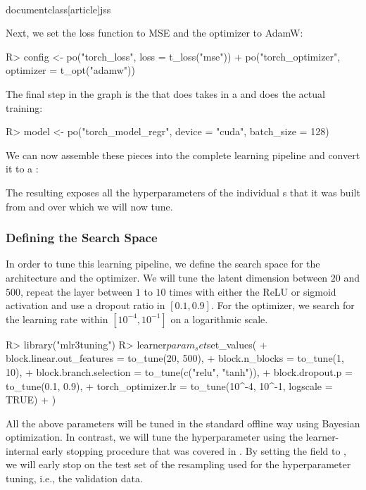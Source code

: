 \\documentclass[article]{jss}
\theoremstyle{definition}
\begin{document}
Next, we set the loss function to MSE and the optimizer to AdamW:

\begin{CodeInput}
R> config <- po("torch_loss", loss = t_loss("mse")) %
+    po("torch_optimizer", optimizer = t_opt("adamw"))
\end{CodeInput}

The final step in the graph is the  that does takes in a  and does the actual training:

\begin{CodeInput}
R> model <- po("torch_model_regr", device = "cuda", batch_size = 128)
\end{CodeInput}

We can now assemble these pieces into the complete learning pipeline and convert it to a :


The resulting  exposes all the hyperparameters of the individual s that it was built from and over which we will now tune.

\subsubsection{Defining the Search Space}
In order to tune this learning pipeline, we define the search space for the architecture and the optimizer.
We will tune the latent dimension between $20$ and $500$, repeat the layer between $1$ to $10$ times with either the ReLU or sigmoid activation and use a dropout ratio in $[0.1, 0.9]$.
For the optimizer, we search for the learning rate within $[10^{-4}, 10^{-1}]$ on a logarithmic scale.

\begin{CodeInput}
R> library("mlr3tuning")
R> learner$param_set$set_values(
+    block.linear.out_features = to_tune(20, 500),
+    block.n_blocks = to_tune(1, 10),
+    block.branch.selection = to_tune(c("relu", "tanh")),
+    block.dropout.p = to_tune(0.1, 0.9),
+    torch_optimizer.lr = to_tune(10^-4, 10^-1, logscale = TRUE)
+  )
\end{CodeInput}

All the above parameters will be tuned in the standard offline way using Bayesian optimization.
In contrast, we will tune the  hyperparameter using the learner-internal early stopping procedure that was covered in .
By setting the  field to , we will early stop on the test set of the resampling used for the hyperparameter tuning, i.e., the validation data.
\end{document}
